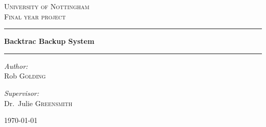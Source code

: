 \begin{center}

\textsc{\LARGE University of Nottingham}\\[1.5cm]

\textsc{\Large Final year project}\\[0.5cm]

\hrule \vspace{0.4cm}
{\huge \bfseries Backtrac Backup System}\\[0.6cm]
\hrule \vspace{1.5cm}

\begin{minipage}{0.4\textwidth}
    \begin{flushleft} \large
        \emph{Author:}\\
        Rob \textsc{Golding}
    \end{flushleft}
\end{minipage}
\begin{minipage}{0.4\textwidth}
    \begin{flushright} \large
        \emph{Supervisor:} \\
        Dr.~Julie \textsc{Greensmith}
    \end{flushright}
\end{minipage}

\vfill

{\large \today}

\end{center}
